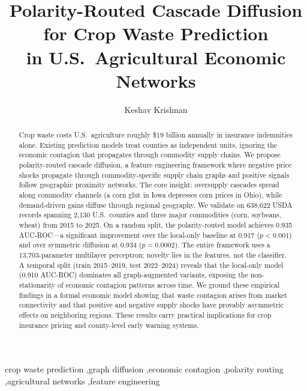 \documentclass[preprint,12pt,authoryear]{elsarticle}
\begin{document}
\begin{frontmatter}

\title{Polarity-Routed Cascade Diffusion for Crop Waste Prediction\\in U.S.\ Agricultural Economic Networks}

\author[inst1]{Keshav Krishnan}


\begin{abstract}
Crop waste costs U.S.\ agriculture roughly \$19 billion annually in insurance indemnities alone. Existing prediction models treat counties as independent units, ignoring the economic contagion that propagates through commodity supply chains. We propose polarity-routed cascade diffusion, a feature engineering framework where negative price shocks propagate through commodity-specific supply chain graphs and positive signals follow geographic proximity networks. The core insight: oversupply cascades spread along commodity channels (a corn glut in Iowa depresses corn prices in Ohio), while demand-driven gains diffuse through regional geography. We validate on 638,622 USDA records spanning 2,130 U.S.\ counties and three major commodities (corn, soybeans, wheat) from 2015 to 2025. On a random split, the polarity-routed model achieves 0.935 AUC-ROC---a significant improvement over the local-only baseline at 0.917 ($p < 0.001$) and over symmetric diffusion at 0.934 ($p = 0.0002$). The entire framework uses a 13,703-parameter multilayer perceptron; novelty lies in the features, not the classifier. A temporal split (train 2015--2019, test 2022--2024) reveals that the local-only model (0.910 AUC-ROC) dominates all graph-augmented variants, exposing the non-stationarity of economic contagion patterns across time. We ground these empirical findings in a formal economic model showing that waste contagion arises from market connectivity and that positive and negative supply shocks have provably asymmetric effects on neighboring regions. These results carry practical implications for crop insurance pricing and county-level early warning systems.
\end{abstract}

\begin{keyword}
crop waste prediction \sep graph diffusion \sep economic contagion \sep polarity routing \sep agricultural networks \sep feature engineering
\end{keyword}

\end{frontmatter}
\end{document}

